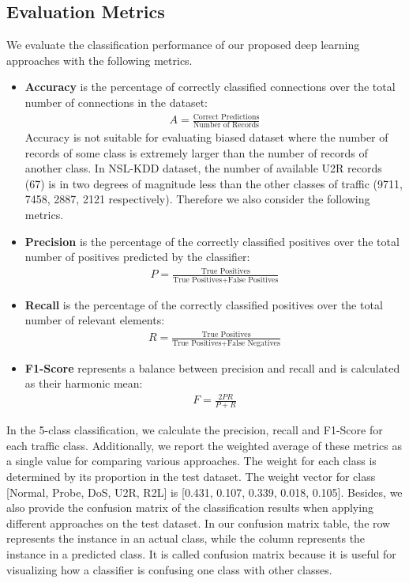 \subsection{Evaluation Metrics}
We evaluate the classification performance of our proposed deep learning approaches
with the following metrics.
\begin{itemize}
    \item \textbf{Accuracy} is the percentage of correctly classified connections
        over the total number of connections in the dataset:
        \begin{align}
            A = \frac{\text{Correct Predictions}}{\text{Number of Records}}
        \end{align} 
        Accuracy is not suitable for evaluating biased dataset where the number
        of records of some class is extremely larger than the number of
        records of another class.
        In NSL-KDD dataset, the number of available U2R records (67)
        is in two degrees of magnitude less than the other classes of traffic
        (9711, 7458, 2887, 2121 respectively).
        Therefore we also consider the following metrics.
    \item \textbf{Precision} is the percentage of the correctly classified positives over
        the total number of positives predicted by the classifier:
                \begin{align}
                    P = \frac{\text{True Positives}}{\text{True Positives} + \text{False Positives}}
                \end{align}
    \item \textbf{Recall} is the percentage of the correctly classified positives over
        the total number of relevant elements:
                \begin{align}
                    R = \frac{\text{True Positives}}{\text{True Positives} + \text{False Negatives}}
                \end{align}
    \item \textbf{F1-Score} represents a balance between precision and recall and is calculated
        as their harmonic mean:
                \begin{align}
                    F = \frac{2PR}{P + R}
                \end{align}
\end{itemize}
In the 5-class classification, we calculate the precision, recall and F1-Score for each traffic class.
Additionally, we report the weighted average of these metrics as a single value for comparing various approaches.
The weight for each class is determined by its proportion in the test dataset.
The weight vector for class [Normal, Probe, DoS, U2R, R2L] is [0.431, 0.107, 0.339, 0.018, 0.105].
Besides, we also provide the confusion matrix of the classification results when applying
different approaches on the test dataset.
In our confusion matrix table, the row represents the instance in an actual class,
while the column represents the instance in a predicted class.
It is called confusion matrix because it is useful for visualizing how a classifier
is confusing one class with other classes.

